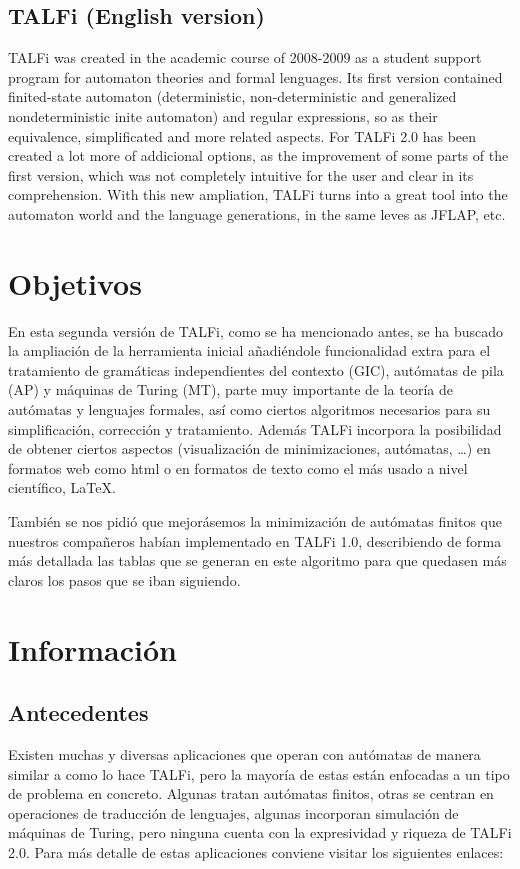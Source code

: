 \documentclass[12pt,a4paper,spanish]{book}
\begin{document}
\section{TALFi (English version)}
TALFi was created in the academic course of 2008-2009 as a student support program for automaton theories and formal lenguages.
Its first version contained finited-state automaton (deterministic, non-deterministic and generalized nondeterministic inite automaton) and regular expressions, so as their equivalence, simplificated and more related aspects.
For TALFi 2.0 has been created a lot more of addicional options, as the improvement of some parts of the first version, which was not completely intuitive for the user and clear in its comprehension.
With this new ampliation, TALFi turns into a great tool into the automaton world and the language generations, in the same leves as JFLAP, etc.


\chapter{Objetivos}
En esta segunda versi\'on de TALFi, como se ha mencionado antes, se ha buscado la ampliaci\'on de la herramienta inicial a\~nadi\'endole funcionalidad extra para el tratamiento de gram\'aticas independientes del contexto (GIC), aut\'omatas de pila (AP) y m\'aquinas de Turing (MT), parte muy importante de la teor\'ia de aut\'omatas y lenguajes formales, as\'i como ciertos algoritmos necesarios para su simplificaci\'on, correcci\'on y tratamiento.
Adem\'as TALFi incorpora la posibilidad de obtener ciertos aspectos (visualizaci\'on de minimizaciones, aut\'omatas, \ldots) en formatos web como html o en formatos de texto como el m\'as usado a nivel cient\'ifico, \LaTeX{}.

Tambi\'en se nos pidi\'o que mejor\'asemos la minimizaci\'on de aut\'omatas finitos que nuestros compa\~neros hab\'ian implementado en TALFi 1.0, describiendo de forma m\'as detallada las tablas que se generan en este algoritmo para que quedasen m\'as claros los pasos que se iban siguiendo. 

\chapter{Informaci\'on}
\section{Antecedentes}
Existen muchas y diversas aplicaciones que operan con aut\'omatas de manera similar a como lo hace TALFi, pero la mayor\'ia de estas est\'an enfocadas a un tipo de problema en concreto.
Algunas tratan aut\'omatas finitos, otras se centran en operaciones de traducci\'on de lenguajes, algunas incorporan simulaci\'on de m\'aquinas de Turing, pero ninguna cuenta con la expresividad y riqueza de TALFi 2.0.
Para m\'as detalle de estas aplicaciones conviene visitar los siguientes enlaces:
\end{document}
